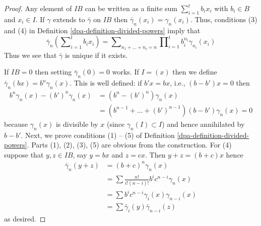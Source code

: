 \begin{proof}

Any element of $IB$ can be written as a finite sum
$\sum\nolimits_{i=1}^t b_ix_i$ with
$b_i \in B$ and $x_i \in I$. If $\gamma$ extends to $\bar\gamma$ on $IB$
then $\bar\gamma_n(x_i) = \gamma_n(x_i)$.
Thus, conditions (3) and (4) in
Definition \ref{dpa-definition-divided-powers} imply that
$$
\bar\gamma_n(\sum\nolimits_{i=1}^t b_ix_i) =
\sum\nolimits_{n_1 + \ldots + n_t = n}
\prod\nolimits_{i = 1}^t b_i^{n_i}\gamma_{n_i}(x_i)
$$
Thus we see that $\bar\gamma$ is unique if it exists.

\medskip\noindent
If $IB = 0$ then setting $\bar\gamma_n(0) = 0$ works. If $I = (x)$
then we define $\bar\gamma_n(bx) = b^n\gamma_n(x)$. This is well defined:
if $b'x = bx$, i.e., $(b - b')x = 0$ then
\begin{align*}
b^n\gamma_n(x) - (b')^n\gamma_n(x)
& =
(b^n - (b')^n)\gamma_n(x) \\
& =
(b^{n - 1} + \ldots + (b')^{n - 1})(b - b')\gamma_n(x) = 0
\end{align*}
because $\gamma_n(x)$ is divisible by $x$ (since
$\gamma_n(I) \subset I$) and hence annihilated by $b - b'$.
Next, we prove conditions (1) -- (5) of
Definition \ref{dpa-definition-divided-powers}.
Parts (1), (2), (3), (5) are obvious from the construction.
For (4) suppose that $y, z \in IB$, say $y = bx$ and $z = cx$. Then
$y + z = (b + c)x$ hence
\begin{align*}
\bar\gamma_n(y + z)
& =
(b + c)^n\gamma_n(x) \\
& =
\sum \frac{n!}{i!(n - i)!}b^ic^{n -i}\gamma_n(x) \\
& =
\sum b^ic^{n - i}\gamma_i(x)\gamma_{n - i}(x) \\
& =
\sum \bar\gamma_i(y)\bar\gamma_{n -i}(z)
\end{align*}
as desired.


\end{proof}
